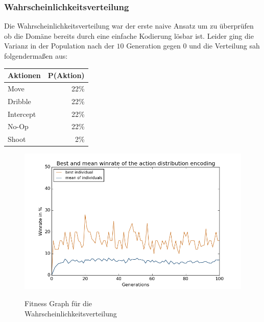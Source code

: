             \subsubsection*{Wahrscheinlichkeitsverteilung}
                \begin{multicols}{2}
                    \noindent
                    Die Wahrscheinlichkeitsverteilung war der erste naive Ansatz um zu überprüfen ob die Domäne bereits durch eine einfache Kodierung lösbar ist. Leider ging die Varianz in der Population nach der $10$ Generation gegen $0$ und die Verteilung sah folgendermaßen aus:
                    \begin{table}[H]
                        \begin{center}
                        \begin{tabular}{ |l|r| } 
                            \hline
                            \hfill Aktionen & P(Aktion)  \\ \hline
                            Move      & 22\% \\ \hline
                            Dribble   & 22\% \\ \hline
                            Intercept & 22\% \\ \hline
                            No-Op     & 22\% \\ \hline
                            Shoot     &  2\% \\ \hline
                        \end{tabular}
                        \end{center}
                    \end{table}

                    \begin{figure}[H]
                        \includegraphics[scale=0.5]{../pictures/summary/actiondist-fitness.png}\\
                        \caption{Fitness Graph für die \\Wahrscheinlichkeitsverteilung}\label{fig:graph-ac}
                    \end{figure}
                \end{multicols}
